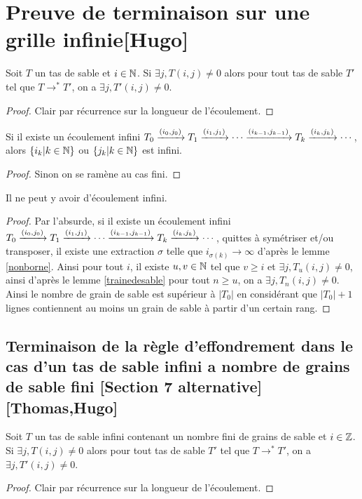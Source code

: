 \section{Preuve de terminaison sur une grille infinie[Hugo]}

\begin{lem}
\label{trainedesable}
Soit $T$ un tas de sable et $i\in\mathbb{N}$.
Si $\exists j,T(i,j)\neq 0$ alors pour tout tas de sable $T'$ tel que $T\rightarrow^*T'$, on a $\exists j,T'(i,j)\neq 0$.
\end{lem}
\begin{proof}
Clair par récurrence sur la longueur de l'écoulement.
\end{proof}

\begin{lem}
\label{nonborne}
Si il existe un écoulement infini $T_0\xrightarrow{(i_{0},j_{0})}T_1\xrightarrow{(i_{1},j_{1})} \cdots \xrightarrow{(i_{k-1},j_{k-1})} T_k \xrightarrow{(i_{k},j_{k})} \cdots$, alors $\{i_k|k\in\mathbb{N}\}$ ou $\{j_k|k\in\mathbb{N}\}$ est infini.
\end{lem}
\begin{proof}
Sinon on se ramène au cas fini.
\end{proof}

\begin{theo}
Il ne peut y avoir d'écoulement infini.
\end{theo}
\begin{proof}
Par l'absurde, si il existe un écoulement infini $T_0\xrightarrow{(i_{0},j_{0})}T_1\xrightarrow{(i_{1},j_{1})} \cdots \xrightarrow{(i_{k-1},j_{k-1})} T_k \xrightarrow{(i_{k},j_{k})} \cdots$, quittes à symétriser et/ou transposer, il existe une extraction $\sigma$ telle que $i_{\sigma(k)}\rightarrow\infty$ d'après le lemme \ref{nonborne}. Ainsi pour tout $i$, il existe $u,v\in\mathbb{N}$ tel que $v\geq i$ et $\exists j,T_u(i,j)\neq 0$, ainsi d'après le lemme \ref{trainedesable} pour tout $n\geq u$, on a $\exists j,T_n(i,j)\neq 0$. Ainsi le nombre de grain de sable est supérieur à $|T_0|$ en considérant que $|T_0|+1$ lignes contiennent au moins un grain de sable à partir d'un certain rang.
\end{proof}


\subsection{Terminaison de la règle d'effondrement dans le cas d'un tas de sable infini a nombre de grains de sable fini [Section 7 alternative][Thomas,Hugo]}

\begin{lem}
Soit $T$ un tas de sable infini contenant un nombre fini de grains de sable et $i\in\mathbb{Z}$.
Si $\exists j,T(i,j)\neq 0$ alors pour tout tas de sable $T'$ tel que $T\rightarrow^*T'$, on a $\exists j,T'(i,j)\neq 0$.
\end{lem}
\begin{proof}
Clair par récurrence sur la longueur de l'écoulement.
\end{proof}

